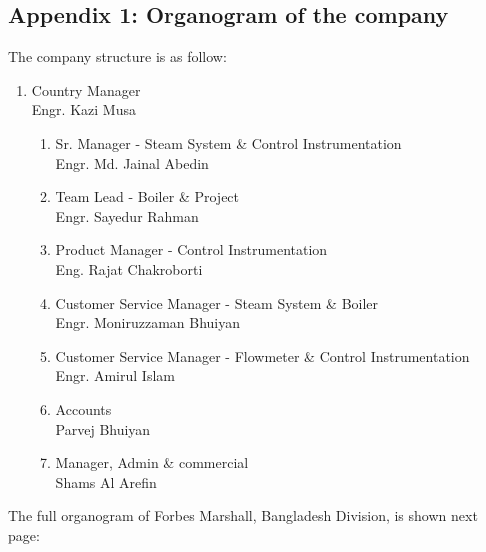 \documentclass[12pt]{article}
\begin{document}
\begin{appendices}
    \section{Appendix 1: Organogram of the company}
    The company structure is as follow:

    \begin{enumerate}
        \item Country Manager\\Engr. Kazi Musa
        \begin{enumerate}
            \item Sr. Manager - Steam System \& Control Instrumentation\\Engr. Md. Jainal Abedin
            \item Team Lead - Boiler \& Project\\Engr. Sayedur Rahman
            \item Product Manager - Control Instrumentation\\Eng. Rajat Chakroborti
            \item Customer Service Manager - Steam System \& Boiler\\Engr. Moniruzzaman Bhuiyan
            \item Customer Service Manager - Flowmeter \& Control Instrumentation\\Engr. Amirul Islam
            \item Accounts\\Parvej Bhuiyan
            \item Manager, Admin \& commercial\\Shams Al Arefin 
        \end{enumerate}
    \end{enumerate}

    The full organogram of Forbes Marshall, Bangladesh Division, is shown next page:
    



\end{appendices}
\end{document}
